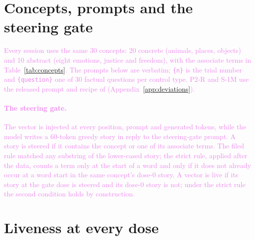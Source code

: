 \documentclass[11pt,a4paper]{article}
\newcommand{\draft}[1]{\textcolor{violet}{#1}}
\begin{document}
\section{Concepts, prompts and the steering gate}
\label{app:prompts}
\draft{Every session uses the same 30 concepts: 20 concrete (animals, places, objects) and 10
abstract (eight emotions, justice and freedom), with the associate terms in
Table~\ref{tab:concepts}. The prompts below are verbatim; \texttt{\{n\}} is the trial number and
\texttt{\{question\}} one of 30 factual questions per control type. P2-R and S-1M use the released
prompt and recipe of \citet{macar2026mechanisms} (Appendix~\ref{app:deviations}).}



\draft{\paragraph{The steering gate.} The vector is injected at every position, prompt and generated
tokens, while the model writes a 60-token greedy story in reply to the steering-gate prompt. A
story is steered if it contains the concept or one of its associate terms. The filed rule matched
any substring of the lower-cased story; the strict rule, applied after the data, counts a term only
at the start of a word and only if it does not already occur at a word start in the same concept's
dose-0 story. A vector is live if its story at the gate dose is steered and its dose-0 story is
not; under the strict rule the second condition holds by construction.}

\begin{table}[h]
\centering
\small

\caption{\draft{The 30 concepts, their categories, and the associate terms the steering gate
matches. Stems such as \texttt{arachn} match any word starting with them.}}
\label{tab:concepts}
\end{table}

\section{Liveness at every dose}
\label{app:livedose}
\begin{table}[t]
\centering
\resizebox{\textwidth}{!}{}
\caption{\draft{Stories steered (filed substring rule, of 30) at each dose, per model and recipe.
Doses are fractions of the residual norm on Qwen and random-calibrated KL targets on Gemma. The
random arm is a norm-matched random direction scored against the paired concept's terms: it
measures how often the gate fires with no concept present. S-1 (Gemma-3-12B and -27B) ran no random
steering arm.}}
\label{tab:livedose}
\end{table}
\end{document}
